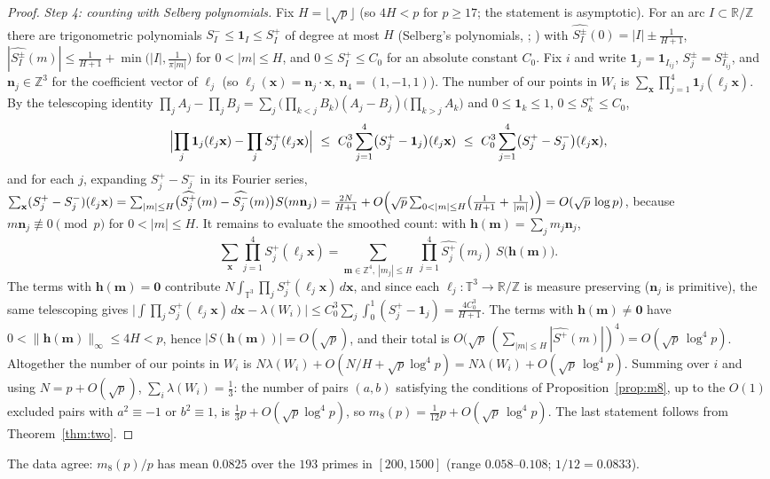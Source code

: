 \documentclass[11pt]{article}
\theoremstyle{remark}
\newcommand{\Z}{\mathbb{Z}}
\begin{document}
\begin{proof}
\emph{Step 4: counting with Selberg polynomials.}  Fix $H=\lfloor\sqrt p\rfloor$ (so $4H<p$ for $p\ge17$; the statement is asymptotic).  For an arc $I\subset\mathbb R/\mathbb Z$
there are trigonometric polynomials $S_I^-\le\mathbf 1_I\le S_I^+$ of degree at most $H$ (Selberg's polynomials, \cite[Ch.~1]{Montgomery};
\cite{Vaaler}) with $\widehat{S_I^\pm}(0)=|I|\pm\frac1{H+1}$, $|\widehat{S_I^\pm}(m)|\le\frac1{H+1}+\min\bigl(|I|,\frac1{\pi|m|}\bigr)$
for $0<|m|\le H$, and $0\le S_I^+\le C_0$ for an absolute constant $C_0$.  Fix $i$ and write $\mathbf 1_j=\mathbf 1_{I_{ij}}$,
$S_j^\pm=S^\pm_{I_{ij}}$, and $\mathbf n_j\in\Z^3$ for the coefficient vector of $\ell_j$ (so $\ell_j(\mathbf x)=\mathbf n_j\cdot\mathbf x$,
$\mathbf n_4=(1,-1,1)$).  The number of our points in $W_i$ is $\sum_{\mathbf x}\prod_{j=1}^4\mathbf 1_j(\ell_j\mathbf x)$.  By the
telescoping identity $\prod_jA_j-\prod_jB_j=\sum_j\bigl(\prod_{k<j}B_k\bigr)(A_j-B_j)\bigl(\prod_{k>j}A_k\bigr)$ and $0\le\mathbf 1_k\le1$,
$0\le S_k^+\le C_0$,
\[
 \Bigl|\prod_j\mathbf 1_j(\ell_j\mathbf x)-\prod_jS_j^+(\ell_j\mathbf x)\Bigr|\ \le\ C_0^3\sum_{j=1}^4\bigl(S_j^+-\mathbf 1_j\bigr)(\ell_j\mathbf x)
 \ \le\ C_0^3\sum_{j=1}^4\bigl(S_j^+-S_j^-\bigr)(\ell_j\mathbf x),
\]
and for each $j$, expanding $S_j^+-S_j^-$ in its Fourier series,
$\sum_{\mathbf x}(S_j^+-S_j^-)(\ell_j\mathbf x)=\sum_{|m|\le H}\bigl(\widehat{S_j^+}(m)-\widehat{S_j^-}(m)\bigr)S(m\mathbf n_j)
=\frac{2N}{H+1}+O\Bigl(\sqrt p\sum_{0<|m|\le H}\bigl(\tfrac1{H+1}+\tfrac1{|m|}\bigr)\Bigr)=O(\sqrt p\,\log p)$,
because $m\mathbf n_j\not\equiv0\pmod p$ for $0<|m|\le H$.  It remains to evaluate the smoothed count: with $\mathbf h(\mathbf m)=\sum_jm_j\mathbf n_j$,
\[
 \sum_{\mathbf x}\prod_{j=1}^4S_j^+(\ell_j\mathbf x)=\sum_{\mathbf m\in\Z^4,\ |m_j|\le H}\ \prod_{j=1}^4\widehat{S_j^+}(m_j)\ S\bigl(\mathbf h(\mathbf m)\bigr).
\]
The terms with $\mathbf h(\mathbf m)=\mathbf 0$ contribute $N\int_{\mathbb T^3}\prod_jS_j^+(\ell_j\mathbf x)\,d\mathbf x$, and since each
$\ell_j:\mathbb T^3\to\mathbb R/\mathbb Z$ is measure preserving ($\mathbf n_j$ is primitive), the same telescoping gives
$\bigl|\int\prod_jS_j^+(\ell_j\mathbf x)\,d\mathbf x-\lambda(W_i)\bigr|\le C_0^3\sum_j\int_0^1(S_j^+-\mathbf 1_j)=\frac{4C_0^3}{H+1}$.
The terms with $\mathbf h(\mathbf m)\ne\mathbf 0$ have $0<\|\mathbf h(\mathbf m)\|_\infty\le4H<p$, hence $|S(\mathbf h(\mathbf m))|=O(\sqrt p)$,
and their total is $O\bigl(\sqrt p\,(\sum_{|m|\le H}|\widehat{S^+}(m)|)^4\bigr)=O(\sqrt p\,\log^4p)$.  Altogether the number of our points in
$W_i$ is $N\lambda(W_i)+O(N/H+\sqrt p\log^4p)=N\lambda(W_i)+O(\sqrt p\,\log^4p)$.  Summing over $i$ and using $N=p+O(\sqrt p)$,
$\sum_i\lambda(W_i)=\tfrac13$: the number of pairs $(a,b)$ satisfying the conditions of Proposition~\ref{prop:m8}, up to the
$O(1)$ excluded pairs with $a^2\equiv-1$ or $b^2\equiv1$, is $\tfrac13p+O(\sqrt p\log^4p)$, so $m_8(p)=\tfrac1{12}p+O(\sqrt p\,\log^4p)$.
The last statement follows from Theorem~\ref{thm:two}.
\end{proof}
The data agree: $m_8(p)/p$ has mean $0.0825$ over the $193$ primes in $[200,1500]$ (range $0.058$--$0.108$; $1/12=0.0833$).
\end{document}
